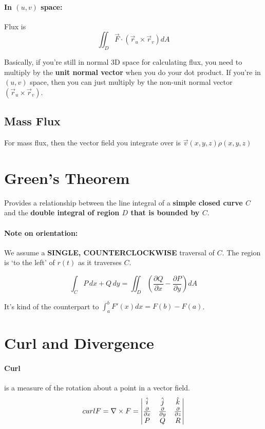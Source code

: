\documentclass[a4paper,12pt]{report}
\begin{document}
\paragraph{In $(u, v)$ space: } Flux is $$\iint_D \vec{F} \cdot (\vec{r}_u \times \vec{r}_v) dA$$

Basically, if you're still in normal 3D space for calculating flux, you need to multiply by the \textbf{unit normal vector} when you do your 
dot product. If you're in $(u, v)$ space, then you can just multiply by the non-unit normal vector $(\vec{r}_u \times \vec{r}_v)$.

\subsection{Mass Flux}
For mass flux, then the vector field you integrate over is $\vec{v}(x, y, z)\rho(x, y, z)$



\section{Green's Theorem}
Provides a relationship between the line integral of a \textbf{simple closed curve $C$} and the \textbf{double integral of 
region $D$ that is bounded by $C$}. 

\paragraph{Note on orientation: } We assume a \textbf{SINGLE, COUNTERCLOCKWISE} traversal of $C$. The region is `to the left' 
of $r(t)$ as it traverses $C$.

$$\int_C P\,dx+Q\,dy = \iint_D (\frac{\partial Q}{\partial x} - \frac{\partial P}{\partial y})dA$$

It's kind of the counterpart to $\int_a^b F'(x) dx = F(b)-F(a)$.

\section{Curl and Divergence}
\paragraph{Curl } is a measure of the rotation about a point in a vector field.
$$curl F = \nabla \times F = 
\begin{vmatrix}
\hat{i} & \hat{j} & \hat{k} \\ 
\frac{\partial}{\partial x} & \frac{\partial}{\partial y} & \frac{\partial }{\partial z} \\
P & Q & R \notag
\end{vmatrix}
$$
\end{document}
